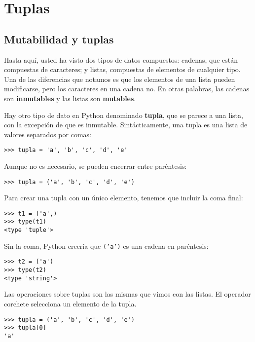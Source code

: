 
\chapter{Tuplas}

\label{tuplechap} 

\section{Mutabilidad y tuplas}

  

Hasta aquí, usted ha visto dos tipos de datos compuestos: cadenas,
que están compuestas de caracteres; y listas, compuestas de elementos
de cualquier tipo. Una de las diferencias que notamos es que los elementos
de una lista pueden modificarse, pero los caracteres en una cadena
no. En otras palabras, las cadenas son \textbf{inmutables} y las listas
son \textbf{mutables}.

 

Hay otro tipo de dato en Python denominado \textbf{tupla}, que se
parece a una lista, con la excepción de que es inmutable. Sintácticamente,
una tupla es una lista de valores separados por comas:
\begin{lstlisting}
>>> tupla = 'a', 'b', 'c', 'd', 'e'
\end{lstlisting}

Aunque no es necesario, se pueden encerrar entre paréntesis:
\begin{lstlisting}
>>> tupla = ('a', 'b', 'c', 'd', 'e')
\end{lstlisting}

Para crear una tupla con un único elemento, tenemos que incluir la
coma final:
\begin{lstlisting}
>>> t1 = ('a',)
>>> type(t1)
<type 'tuple'>
\end{lstlisting}

Sin la coma, Python creería que \texttt{('a')} es una cadena en paréntesis:
\begin{lstlisting}
>>> t2 = ('a')
>>> type(t2)
<type 'string'>
\end{lstlisting}

Las operaciones sobre tuplas son las mismas que vimos con las listas.
El operador corchete selecciona un elemento de la tupla.
\begin{lstlisting}
>>> tupla = ('a', 'b', 'c', 'd', 'e')
>>> tupla[0]
'a'
\end{lstlisting}

